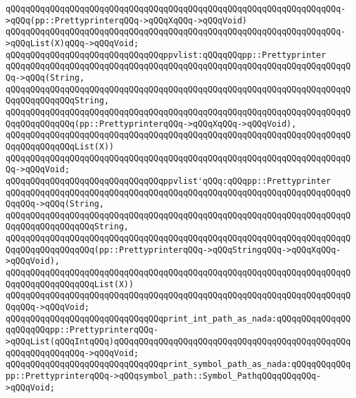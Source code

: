 \verb|qQQqqQQqqQQqqQQqqQQqqQQqqQQqqQQqqQQqqQQqqQQqqQQqqQQqqQQqqQQqqQQqqQQq->qQQq(pp::PrettyprinterqQQq->qQQqXqQQq->qQQqVoid)|\newline
\verb|qQQqqQQqqQQqqQQqqQQqqQQqqQQqqQQqqQQqqQQqqQQqqQQqqQQqqQQqqQQqqQQqqQQq->qQQqList(X)qQQq->qQQqVoid;|\newline
\newline
\verb|qQQqqQQqqQQqqQQqqQQqqQQqqQQqqQQqppvlist:qQQqqQQqpp::Prettyprinter|\newline
\verb|qQQqqQQqqQQqqQQqqQQqqQQqqQQqqQQqqQQqqQQqqQQqqQQqqQQqqQQqqQQqqQQqqQQqqQQq->qQQq(String,|\newline
\verb|qQQqqQQqqQQqqQQqqQQqqQQqqQQqqQQqqQQqqQQqqQQqqQQqqQQqqQQqqQQqqQQqqQQqqQQqqQQqqQQqqQQqString,|\newline
\verb|qQQqqQQqqQQqqQQqqQQqqQQqqQQqqQQqqQQqqQQqqQQqqQQqqQQqqQQqqQQqqQQqqQQqqQQqqQQqqQQqqQQq(pp::PrettyprinterqQQq->qQQqXqQQq->qQQqVoid),|\newline
\verb|qQQqqQQqqQQqqQQqqQQqqQQqqQQqqQQqqQQqqQQqqQQqqQQqqQQqqQQqqQQqqQQqqQQqqQQqqQQqqQQqqQQqList(X))|\newline
\verb|qQQqqQQqqQQqqQQqqQQqqQQqqQQqqQQqqQQqqQQqqQQqqQQqqQQqqQQqqQQqqQQqqQQqqQQq->qQQqVoid;|\newline
\newline
\verb|qQQqqQQqqQQqqQQqqQQqqQQqqQQqqQQqppvlist'qQQq:qQQqpp::Prettyprinter|\newline
\verb|qQQqqQQqqQQqqQQqqQQqqQQqqQQqqQQqqQQqqQQqqQQqqQQqqQQqqQQqqQQqqQQqqQQqqQQqqQQq->qQQq(String,|\newline
\verb|qQQqqQQqqQQqqQQqqQQqqQQqqQQqqQQqqQQqqQQqqQQqqQQqqQQqqQQqqQQqqQQqqQQqqQQqqQQqqQQqqQQqqQQqString,|\newline
\verb|qQQqqQQqqQQqqQQqqQQqqQQqqQQqqQQqqQQqqQQqqQQqqQQqqQQqqQQqqQQqqQQqqQQqqQQqqQQqqQQqqQQqqQQq(pp::PrettyprinterqQQq->qQQqStringqQQq->qQQqXqQQq->qQQqVoid),|\newline
\verb|qQQqqQQqqQQqqQQqqQQqqQQqqQQqqQQqqQQqqQQqqQQqqQQqqQQqqQQqqQQqqQQqqQQqqQQqqQQqqQQqqQQqqQQqList(X))|\newline
\verb|qQQqqQQqqQQqqQQqqQQqqQQqqQQqqQQqqQQqqQQqqQQqqQQqqQQqqQQqqQQqqQQqqQQqqQQqqQQq->qQQqVoid;|\newline
\newline
\verb|qQQqqQQqqQQqqQQqqQQqqQQqqQQqqQQqprint_int_path_as_nada:qQQqqQQqqQQqqQQqqQQqqQQqpp::PrettyprinterqQQq->qQQqList(qQQqIntqQQq)qQQqqQQqqQQqqQQqqQQqqQQqqQQqqQQqqQQqqQQqqQQqqQQqqQQqqQQqqQQqqQQq->qQQqVoid;|\newline
\verb|qQQqqQQqqQQqqQQqqQQqqQQqqQQqqQQqprint_symbol_path_as_nada:qQQqqQQqqQQqpp::PrettyprinterqQQq->qQQqsymbol_path::Symbol_PathqQQqqQQqqQQq->qQQqVoid;|\newline
